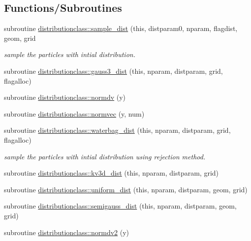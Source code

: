 \subsection*{Functions/\+Subroutines}
\begin{DoxyCompactItemize}
\item 
subroutine \mbox{\hyperlink{namespacedistributionclass_a90036cb4aa43f5e3f9844bc412d2a766}{distributionclass\+::sample\+\_\+dist}} (this, distparam0, nparam, flagdist, geom, grid
\begin{DoxyCompactList}\small\item\em sample the particles with intial distribution. \end{DoxyCompactList}\item 
subroutine \mbox{\hyperlink{namespacedistributionclass_af85f956a3fdb677022a546bc69ecfb3c}{distributionclass\+::gauss3\+\_\+dist}} (this, nparam, distparam, grid, flagalloc)
\item 
subroutine \mbox{\hyperlink{namespacedistributionclass_a00377c8aa90fa9dc8b222d71d019f936}{distributionclass\+::normdv}} (y)
\item 
subroutine \mbox{\hyperlink{namespacedistributionclass_acfc04ca0c8be3e0f3e73779c5e88693b}{distributionclass\+::normvec}} (y, num)
\item 
subroutine \mbox{\hyperlink{namespacedistributionclass_aed734df6d00f7004cf11847adb42dd1d}{distributionclass\+::waterbag\+\_\+dist}} (this, nparam, distparam, grid, flagalloc)
\begin{DoxyCompactList}\small\item\em sample the particles with intial distribution using rejection method. \end{DoxyCompactList}\item 
subroutine \mbox{\hyperlink{namespacedistributionclass_a2e96d2c85cac39531d37f2ce057c5766}{distributionclass\+::kv3d\+\_\+dist}} (this, nparam, distparam, grid)
\item 
subroutine \mbox{\hyperlink{namespacedistributionclass_a4a013e2bf1afc4cdeefe0fce7f0e0e00}{distributionclass\+::uniform\+\_\+dist}} (this, nparam, distparam, geom, grid)
\item 
subroutine \mbox{\hyperlink{namespacedistributionclass_a0e031187f6b2818aebcd2911b93c0722}{distributionclass\+::semigauss\+\_\+dist}} (this, nparam, distparam, geom, grid)
\item 
subroutine \mbox{\hyperlink{namespacedistributionclass_a020961b4717af242fc3c82090a17ce12}{distributionclass\+::normdv2}} (y)
\item 

\end{DoxyCompactItemize}
